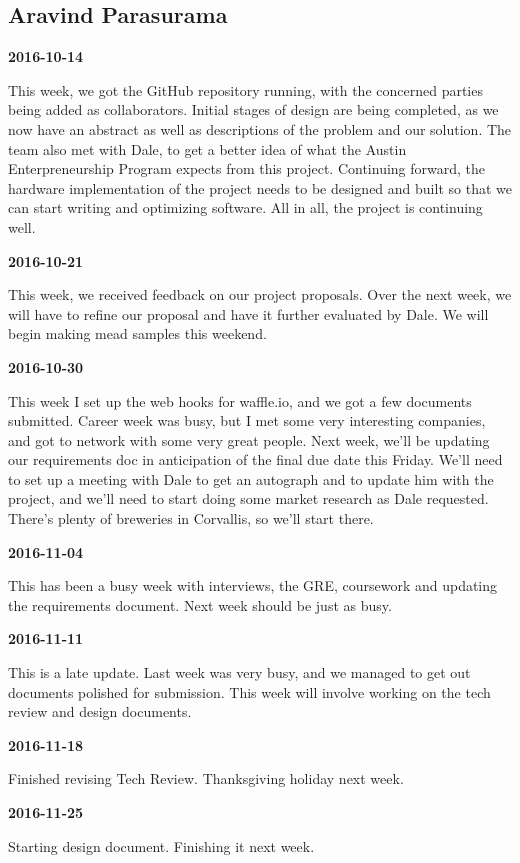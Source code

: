 \subsection{Aravind Parasurama}

\textbf{2016-10-14}

This week, we got the GitHub repository running, with the concerned parties being added as collaborators. Initial stages of design are being completed, as we now have an abstract as well as descriptions of the problem and our solution. The team also met with Dale, to get a better idea of what the Austin Enterpreneurship Program expects from this project. Continuing forward, the hardware implementation of the project needs to be designed and built so that we can start writing and optimizing software. All in all, the project is continuing well.

\textbf{2016-10-21} 

This week, we received feedback on our project proposals. Over the next week, we will have to refine our proposal and have it further evaluated by Dale. We will begin making mead samples this weekend.

\textbf{2016-10-30} 

This week I set up the web hooks for waffle.io, and we got a few documents submitted. Career week was busy, but I met some very interesting companies, and got to network with some very great people. Next week, we'll be updating our requirements doc in anticipation of the final due date this Friday. We'll need to set up a meeting with Dale to get an autograph and to update him with the project, and we'll need to start doing some market research as Dale requested. There's plenty of breweries in Corvallis, so we'll start there. 

\textbf{2016-11-04} 

This has been a busy week with interviews, the GRE, coursework and updating the requirements document. Next week should be just as busy.

\textbf{2016-11-11} 

This is a late update. Last week was very busy, and we managed to get out documents polished for submission. This week will involve working on the tech review and design documents.

\textbf{2016-11-18} 

Finished revising Tech Review. Thanksgiving holiday next week.

\textbf{2016-11-25} 

Starting design document. Finishing it next week.

